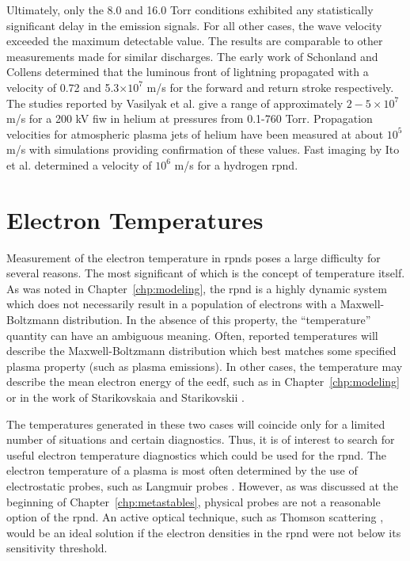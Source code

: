 Ultimately, only the 8.0 and 16.0 Torr conditions exhibited any statistically
significant delay in the emission signals. For all other cases, the wave
velocity exceeded the maximum detectable value. The results are comparable to
other measurements made for similar discharges. The early work of Schonland and
Collens \cite{Schonland1933} determined that the luminous front of lightning
propagated with a velocity of 0.72 and 5.3$\times10^7$ m/s for the forward and
return stroke respectively. The studies reported by Vasilyak et al.
\cite{Vasilyak1994} give a range of approximately $2-5\times10^7$ m/s for a 200
kV \acs{fiw} in helium at pressures from 0.1-760 Torr. Propagation velocities
for atmospheric plasma jets of helium have been measured at about $10^5$ m/s
\cite{Lu2006} with simulations providing confirmation \cite{Naidis2010} of these
values. Fast imaging by Ito et al. \cite{Ito2010} determined a velocity of
$10^6$ m/s for a hydrogen \acs{rpnd}.

\section{Electron Temperatures}

Measurement of the electron temperature in \acs{rpnd}s poses a large difficulty
for several reasons. The most significant of which is the concept of temperature
itself. As was noted in Chapter~\ref{chp:modeling}, the \acs{rpnd} is a highly
dynamic system which does not necessarily result in a population of electrons
with a Maxwell-Boltzmann distribution. In the absence of this property, the
``temperature'' quantity can have an ambiguous meaning. Often, reported
temperatures will describe the Maxwell-Boltzmann distribution which best matches
some specified plasma property (such as plasma emissions). In other cases, the
temperature may describe the mean electron energy of the \acs{eedf}, such as in
Chapter~\ref{chp:modeling} or in the work of Starikovskaia and Starikovskii
\cite{Starikovskaia2001}.

The temperatures generated in these two cases will coincide only for a limited
number of situations and certain diagnostics. Thus, it is of interest to search
for useful electron temperature diagnostics which could be used for the
\acs{rpnd}. The electron temperature of a plasma is most often determined by the
use of electrostatic probes, such as Langmuir probes \cite{Lieberman2005}.
However, as was discussed at the beginning of Chapter~\ref{chp:metastables},
physical probes are not a reasonable option of the \acs{rpnd}. An active optical
technique, such as Thomson scattering \cite{VanGessel2012}, would be an ideal
solution if the electron densities in the \acs{rpnd} were not below its
sensitivity threshold.

